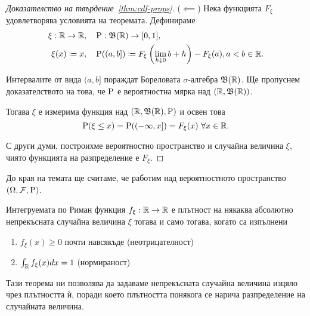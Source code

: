 \documentclass[numbers=endperiod, DIV=15, bibliography=totocnumbered]{scrartcl}
\begin{document}
\begin{proof}[Доказателство на твърдение~\ref{thm:cdf-props}]
  ($\impliedby$) Нека функцията $F_\xi$ удовлетворява условията на теоремата. Дефинираме
  \begin{align*}
    \xi: \mathbb{R} \to \mathbb{R},     &&& \operatorname{P}: \mathfrak{B}(\mathbb{R}) \to [0, 1], \\
    \xi(x) \coloneqq x, &&& \operatorname{P}((a, b]) \coloneqq F_\xi \left(\lim_{h \downarrow 0} b + h \right) - F_\xi(a), a < b \in \mathbb{R}.
  \end{align*}

  Интервалите от вида $(a, b]$ пораждат Бореловата $\sigma$-алгебра $\mathfrak{B}(\mathbb{R})$. Ще пропуснем доказателството на това, че $\operatorname{P}$ е вероятностна мярка над $(\mathbb{R}, \mathfrak{B}(\mathbb{R}))$.

  Тогава $\xi$ е измерима функция над $(\mathbb{R}, \mathfrak{B}(\mathbb{R}), \operatorname{P})$ и освен това
  \begin{displaymath}
    \operatorname{P}(\xi \leq x)
    =
    \operatorname{P}((-\infty, x])
    =
    F_\xi(x)~\forall x \in \mathbb{R}.
  \end{displaymath}

  С други думи, построихме вероятностно пространство и случайна величина $\xi$, чиято функцията на разпределение е $F_\xi$.
\end{proof}

До края на темата ще считаме, че работим над вероятностното пространство $(\Omega, \mathcal{F}, \operatorname{P})$.

\begin{theorem}\label{thm:density-props}
  Интегруемата по Риман функция $f_\xi: \mathbb{R} \to \mathbb{R}$ е плътност на някаква абсолютно непрекъсната случайна величина $\xi$ тогава и само тогава, когато са изпълнени
  \begin{enumerate}
    \item $f_\xi(x) \geq 0$ почти навсякъде (неотрицателност)
    \item $\int_{\mathbb{R}} f_\xi(x) dx = 1$ (нормираност)
  \end{enumerate}
\end{theorem}

Тази теорема ни позволява да задаваме непрекъсната случайна величина изцяло чрез плътността ѝ, поради което плътността понякога се нарича разпределение на случайната величина.
\end{document}
